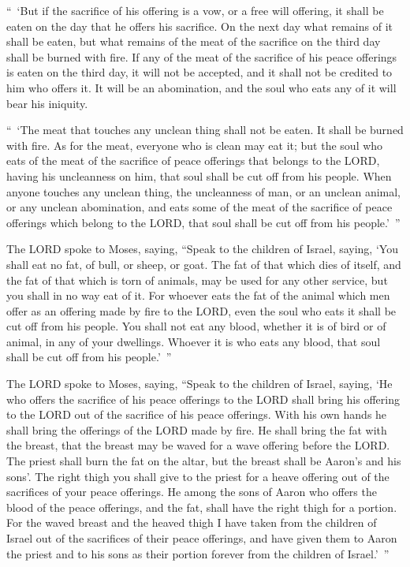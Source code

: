 \myverse{}“ ‘But if the sacrifice of his offering is a vow, or a free will
offering, it shall be eaten on the day that he offers his sacrifice. On the next day what remains of it
shall be eaten,
\myverse{}but what remains of the meat of the sacrifice on the third day shall be burned
with fire.
\myverse{}If any of the meat of the sacrifice of his peace offerings is eaten on the
third day, it will not be accepted, and it shall not be credited to him who offers it. It will be an abomination,
and the soul who eats any of it will bear his iniquity.


\myverse{}“ ‘The meat that touches any unclean thing shall not be eaten.
It shall be burned with fire. As for the meat, everyone who is clean may eat it;
\myverse{}but the soul who eats of the meat of the sacrifice of peace offerings that
belongs to the LORD, having his uncleanness on him, that soul shall be cut off from his people.
\myverse{}When anyone touches any unclean thing, the uncleanness of man, or an unclean
animal, or any unclean abomination, and eats some of the meat of the sacrifice of peace offerings which
belong to the LORD, that soul shall be cut off from his people.’ ”


\myverse{}The LORD spoke to Moses, saying,
\myverse{}“Speak to the children of Israel, saying, ‘You shall eat no fat, of bull,
or sheep, or goat.
\myverse{}The fat of that which dies of itself, and the fat of that which is torn of
animals, may be used for any other service, but you shall in no way eat of it.
\myverse{}For whoever eats the fat of the animal which men offer as an offering made
by fire to the LORD, even the soul who eats it shall be cut off from his people.
\myverse{}You shall not eat any blood, whether it is of bird or of animal, in any of
your dwellings.
\myverse{}Whoever it is who eats any blood, that soul shall be cut off from his people.’ ”


\myverse{}The LORD spoke to Moses, saying,
\myverse{}“Speak to the children of Israel, saying, ‘He who offers the sacrifice of
his peace offerings to the LORD shall bring his offering to the LORD out of the sacrifice of his peace
offerings.
\myverse{}With his own hands he shall bring the offerings of the LORD made by fire.
He shall bring the fat with the breast, that the breast may be waved for a wave offering before the LORD.
\myverse{}The priest shall burn the fat on the altar, but the breast shall be Aaron’s
and his sons’.
\myverse{}The right thigh you shall give to the priest for a heave offering out of the
sacrifices of your peace offerings.
\myverse{}He among the sons of Aaron who offers the blood of the peace offerings, and
the fat, shall have the right thigh for a portion.
\myverse{}For the waved breast and the heaved thigh I have taken from the children of
Israel out of the sacrifices of their peace offerings, and have given them to Aaron the priest and to
his sons as their portion forever from the children of Israel.’ ”


